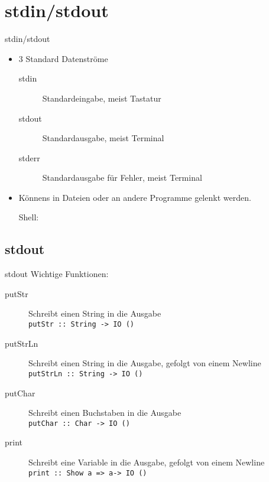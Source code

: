 \documentclass{beamer}
\begin{document}
\section{stdin/stdout}
\begin{frame}[<+->][fragile]{stdin/stdout}
\begin{itemize}
\item 3 Standard Datenströme
\begin{small}
\begin{description}
\item[stdin] Standardeingabe, meist Tastatur
\item[stdout] Standardausgabe, meist Terminal
\item[stderr] Standardausgabe für Fehler, meist Terminal
\end{description}
\end{small}
\item Könnens in Dateien oder an andere Programme gelenkt werden.
\begin{block}{Shell:}
\end{block}
\end{itemize}
\end{frame}

\subsection{stdout}
\begin{frame}[<+->]{stdout}
Wichtige Funktionen:
\begin{description}
\item[putStr] Schreibt einen String in die Ausgabe \\ \texttt{putStr :: String -> IO ()}
\item[putStrLn] Schreibt einen String in die Ausgabe, gefolgt von einem Newline \\ \texttt{putStrLn :: String -> IO ()}
\item[putChar] Schreibt einen Buchstaben in die Ausgabe \\ \texttt{putChar :: Char -> IO ()}
\item[print] Schreibt eine Variable in die Ausgabe, gefolgt von einem Newline \\ \texttt{print :: Show a => a-> IO ()}
\end{description}
\end{frame}
\end{document}
